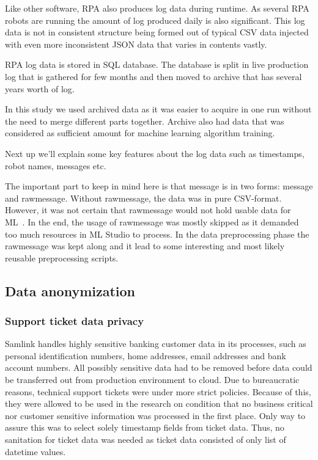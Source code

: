 Like other software,
RPA also produces log data during runtime.
As several RPA robots are running
the amount of log produced daily is also significant.
This log data is not in consistent structure
being formed out of typical CSV data
injected with even more inconsistent JSON data
that varies in contents vastly.

RPA log data is stored in SQL database.
The database is split in live production log
that is gathered for few months
and then moved to archive that has
several years worth of log.

In this study we used archived data
as it was easier to acquire in one run
without the need to merge different parts together.
Archive also had
data that was considered as sufficient amount
for machine learning algorithm training.

\begin{itcomment}
    Next up we'll explain some key features about the log data
    such as timestamps, robot names, messages etc.

    The important part to keep in mind here is that message is in two forms:
    message and rawmessage.
    Without rawmessage, the data was in pure CSV-format.
    However, it was not certain that rawmessage would not hold usable data for ML~.
    In the end, the usage of rawmessage was mostly skipped
    as it demanded too much resources in ML Studio to process.
    In the data preprocessing phase the rawmessage was kept along
    and it lead to some interesting and most likely reusable preprocessing scripts.
\end{itcomment}


\subsection{Data anonymization}\label{subsec:meth-data-anonymization}

\subsubsection*{Support ticket data privacy}
Samlink handles highly sensitive banking customer data in its processes,
such as personal identification numbers, home addresses, email addresses and bank account numbers.
All possibly sensitive data had to be removed
before data could be transferred out from production environment to cloud.
Due to bureaucratic reasons,
technical support tickets were under more strict policies.
Because of this,
they were allowed to be used in the research
on condition that no business critical nor customer sensitive information
was processed in the first place.
Only way to assure this
was to select solely timestamp fields from ticket data.
Thus, no sanitation for ticket data was needed
as ticket data consisted of only list of datetime values.

